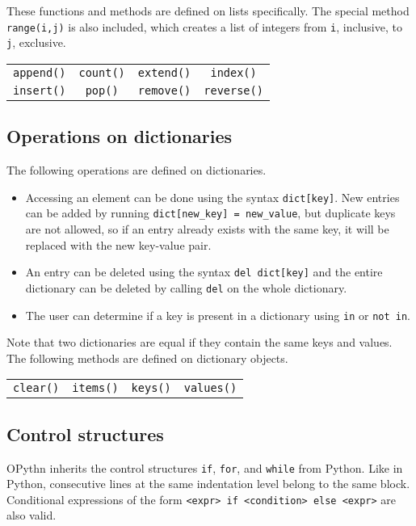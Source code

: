 \documentclass[11pt, twoside]{article}
\newcommand{\ms}{\texttt}
\begin{document}
    These functions and methods are defined on lists specifically. The special method \ms{range(i,j)} is also included, which creates a list of integers from \ms{i}, inclusive, to \ms{j}, exclusive.
    \begin{center}
        \begin{tabular}{cccc}
            \ms{append()} & \ms{count()} & \ms{extend()} & \ms{index()}\\
            \ms{insert()} & \ms{pop()} & \ms{remove()} & \ms{reverse()}\\
    \end{tabular}
    \end{center}

    \subsection{Operations on dictionaries}
    The following operations are defined on dictionaries.
    \begin{itemize}
        \item Accessing an element can be done using the syntax \ms{dict[key]}. New entries can be added by running \ms{dict[new\_key] = new\_value}, but duplicate keys are not allowed, so if an entry already exists with the same key, it will be replaced with the new key-value pair.
        \item An entry can be deleted using the syntax \ms{del dict[key]} and the entire dictionary can be deleted by calling \ms{del} on the whole dictionary.
        \item The user can determine if a key is present in a dictionary using \ms{in} or \ms{not in}.
    \end{itemize}
    Note that two dictionaries are equal if they contain the same keys and values. The following methods are defined on dictionary objects.
    \begin{center}
        \begin{tabular}{cccc}
            \ms{clear()} & \ms{items()} & \ms{keys()} & \ms{values()}\\
    \end{tabular}
    \end{center}

    \subsection{Control structures}
    OPythn inherits the control structures \ms{if}, \ms{for}, and \ms{while} from Python. Like in Python, consecutive lines at the same indentation level belong to the same block. Conditional expressions of the form \ms{<expr> if <condition> else <expr>} are also valid.
\end{document}
